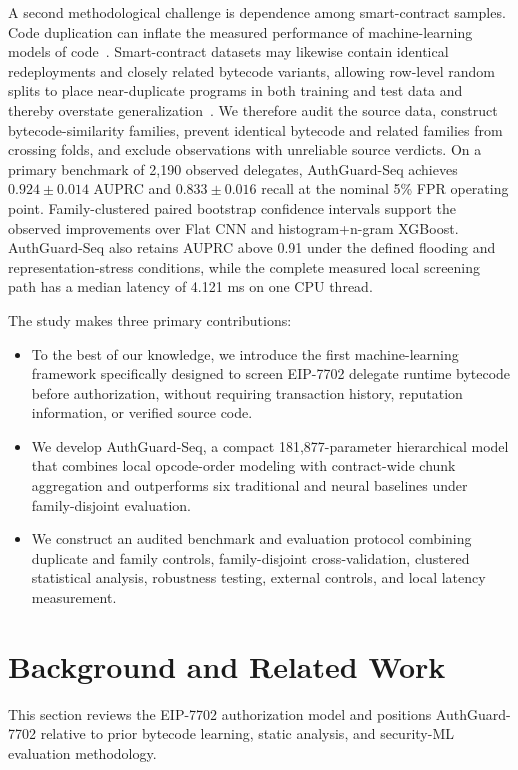 \documentclass[conference]{IEEEtran}
\begin{document}
A second methodological challenge is dependence among smart-contract samples. Code duplication can inflate the measured performance of machine-learning models of code~\cite{allamanis2019duplication}. Smart-contract datasets may likewise contain identical redeployments and closely related bytecode variants, allowing row-level random splits to place near-duplicate programs in both training and test data and thereby overstate generalization~\cite{tesseract2019}. We therefore audit the source data, construct bytecode-similarity families, prevent identical bytecode and related families from crossing folds, and exclude observations with unreliable source verdicts. On a primary benchmark of 2,190 observed delegates, AuthGuard-Seq achieves $0.924\pm0.014$ AUPRC and $0.833\pm0.016$ recall at the nominal 5\% FPR operating point. Family-clustered paired bootstrap confidence intervals support the observed improvements over Flat CNN and histogram+n-gram XGBoost. AuthGuard-Seq also retains AUPRC above 0.91 under the defined flooding and representation-stress conditions, while the complete measured local screening path has a median latency of 4.121 ms on one CPU thread.

The study makes three primary contributions:
\begin{itemize}
    \item To the best of our knowledge, we introduce the first machine-learning framework specifically designed to screen EIP-7702 delegate runtime bytecode before authorization, without requiring transaction history, reputation information, or verified source code.
    \item We develop AuthGuard-Seq, a compact 181,877-parameter hierarchical model that combines local opcode-order modeling with contract-wide chunk aggregation and outperforms six traditional and neural baselines under family-disjoint evaluation.
    \item We construct an audited benchmark and evaluation protocol combining duplicate and family controls, family-disjoint cross-validation, clustered statistical analysis, robustness testing, external controls, and local latency measurement.
\end{itemize}

\section{Background and Related Work}
\label{sec:related}
This section reviews the EIP-7702 authorization model and positions AuthGuard-7702 relative to prior bytecode learning, static analysis, and security-ML evaluation methodology.
\end{document}
